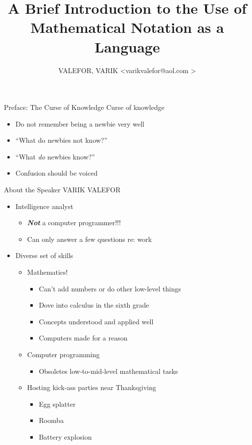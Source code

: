 \documentclass{beamer}
\title[BRINMANOLA]{A Brief Introduction to the Use of Mathematical Notation as a Language}
\author[VALEFOR, VARIK]{VALEFOR, VARIK \textless varikvalefor@aol.com \!\!\textgreater}
\begin{document}
	\maketitle
	\begin{frame}{Preface: The Curse of Knowledge}
		Curse of knowledge
		\begin{itemize}
			\item Do not remember being a newbie very well
			\item ``What do newbies not know?''
			\item ``What \textit{do} newbies know?''
			\item Confusion should be voiced
		\end{itemize}
\end{frame}
	\begin{frame}{About the Speaker}
		VARIK VALEFOR
			\begin{itemize}
				\item Intelligence analyst
				\begin{itemize}
				\item \textbf{\textit{Not}} a computer programmer!!!
				\item Can only answer a few questions re: work
			\end{itemize}
				\item Diverse set of skills
			\begin{itemize}
				\item Mathematics!
				\begin{itemize}
					\item Can't add numbers or do other low-level things
					\item Dove into calculus in the sixth grade
					\item Concepts understood and applied well
					\item Computers made for a reason
				\end{itemize}
				\item Computer programming
				\begin{itemize}
					\item Obsoletes low-to-mid-level mathematical tasks
				\end{itemize}
				\item Hosting kick-ass parties near Thanksgiving
				\begin{itemize}
					\item Egg splatter
					\item Roomba
					\item Battery explosion
				\end{itemize}
			\end{itemize}
		\end{itemize}
	\end{frame}
\end{document}
